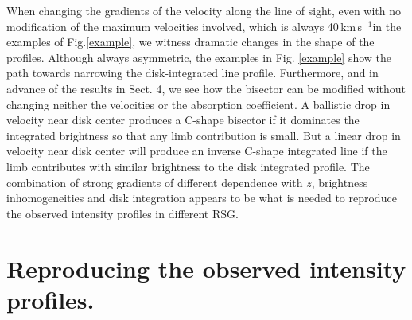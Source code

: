 \documentclass{/Users/art2/TeX/aanda/aa}
\def\kms {km\,s$^{-1}$}
\begin{document}
When changing the gradients of the velocity along the line of sight, even with no modification of the maximum velocities involved, which is 
always 40\,\kms in the examples of Fig.\ref{example}, we witness dramatic changes in the shape of the profiles. Although always asymmetric, the 
examples 
in Fig. \ref{example} show the path towards narrowing the disk-integrated line profile. Furthermore, and in advance of the results in Sect. 4, we see how the bisector can be modified without 
changing neither the velocities or the absorption 
coefficient. A ballistic drop in velocity near disk center produces a C-shape bisector if it dominates the integrated brightness so that any limb 
contribution is 
small. But a linear drop in velocity near disk center will produce an inverse C-shape integrated line if the limb contributes with similar brightness 
to the 
disk integrated profile. The combination of strong gradients of different dependence with $z$, brightness inhomogeneities and disk integration 
appears to be what is needed to reproduce the observed intensity profiles in different RSG.

\section{Reproducing the observed intensity profiles.}
\end{document}
